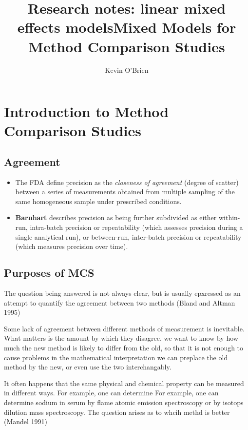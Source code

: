 \documentclass[12pt, a4paper]{report}
\title{Research notes: linear mixed effects models}
\author{ } \date{ }
\theoremstyle{plain}
\theoremstyle{definition}
\theoremstyle{remark}
\begin{document}
	\author{Kevin O'Brien}
	\title{Mixed Models for Method Comparison Studies}
	\tableofcontents


	\chapter{Introduction to Method Comparison Studies}



	\section{Agreement}
	\begin{itemize}
		\item The FDA define precision as the \textit{closeness of agreement} (degree of
		scatter) between a series of measurements obtained from multiple
		sampling of the same homogeneous sample under prescribed
		conditions. 
		\item \textbf{Barnhart} describes precision as being further
		subdivided as either within-run, intra-batch precision or
		repeatability (which assesses precision during a single analytical
		run), or between-run, inter-batch precision or repeatability
		(which measures precision over time).
	\end{itemize}
	


	\section{Purposes of MCS}
	
	The  question being answered is not always clear, but is usually epxressed as an attempt to quantify the agreement
	between two methods (Bland and Altman 1995)
	
	Some lack of agreement between different methods of measurement is inevitable. What matters is the amount by which they
	disagree. we want to know by how much the new method is likely to differ from the old, so that it is not enough to cause
	problems in the mathematical interpretation we can preplace the old method by the new, or even use the two interchangably.
	
	
	It often happens that the same physical and chemical property can be measured in different ways. For example, one can determine
	For example, one can determine sodium in serum by flame atomic emission spectroscopy or by isotops dilution mass spectroscopy. The question arises as to whcih methd is better (Mandel 1991)
	
\end{document}

